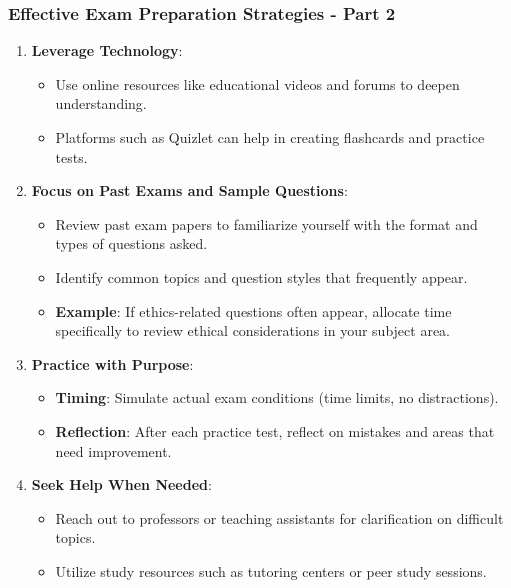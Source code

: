 \documentclass[aspectratio=169]{beamer}
\begin{document}
\begin{frame}[fragile]
    \frametitle{Effective Exam Preparation Strategies - Part 2}
    \begin{enumerate}[resume]
        \item \textbf{Leverage Technology}:
            \begin{itemize}
                \item Use online resources like educational videos and forums to deepen understanding.
                \item Platforms such as Quizlet can help in creating flashcards and practice tests.
            \end{itemize}

        \item \textbf{Focus on Past Exams and Sample Questions}:
            \begin{itemize}
                \item Review past exam papers to familiarize yourself with the format and types of questions asked.
                \item Identify common topics and question styles that frequently appear.
                \item \textbf{Example}: If ethics-related questions often appear, allocate time specifically to review ethical considerations in your subject area.
            \end{itemize}

        \item \textbf{Practice with Purpose}:
            \begin{itemize}
                \item \textbf{Timing}: Simulate actual exam conditions (time limits, no distractions).
                \item \textbf{Reflection}: After each practice test, reflect on mistakes and areas that need improvement.
            \end{itemize}

        \item \textbf{Seek Help When Needed}:
            \begin{itemize}
                \item Reach out to professors or teaching assistants for clarification on difficult topics.
                \item Utilize study resources such as tutoring centers or peer study sessions.
            \end{itemize}
    \end{enumerate}
\end{frame}
\end{document}
